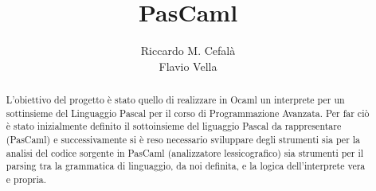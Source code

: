 \documentclass[a4paper,10pt]{article}
\title{PasCaml}
\author{Riccardo M. Cefal\`a \\Flavio Vella}
\begin{document}
\maketitle

\begin{abstract}
L'obiettivo del progetto \`e stato quello di realizzare in Ocaml un interprete 
per un sottinsieme del Linguaggio Pascal per il corso di Programmazione
Avanzata.
Per far ci\`o \`e stato inizialmente
definito il sottoinsieme del liguaggio Pascal da rappresentare (PasCaml)  e 
successivamente si \`e reso necessario sviluppare degli strumenti sia per la
analisi del codice sorgente in PasCaml (analizzatore lessicografico) sia
strumenti per il parsing tra la grammatica di linguaggio, da noi definita, e la
logica dell'interprete vera e propria.
\end{abstract}
\end{document}
